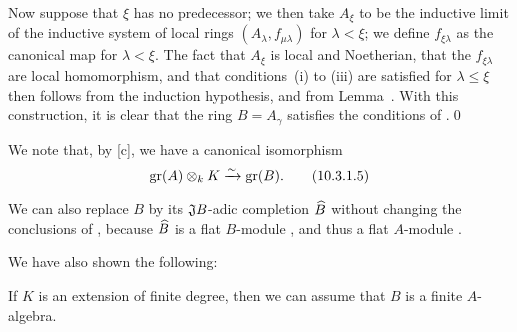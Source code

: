\begin{env}[10.3.1.4]
Now suppose that $\xi$ has no predecessor;
we then take $A_\xi$ to be the inductive limit of the inductive system of local rings $(A_\lambda,f_{\mu\lambda})$ for $\lambda<\xi$;
we define $f_{\xi\lambda}$ as the canonical map for $\lambda<\xi$.
The fact that $A_\xi$ is local and Noetherian, that the $f_{\xi\lambda}$ are local homomorphism, and that conditions~(i) to (iii) are satisfied for $\lambda\leq\xi$
then follows from the induction hypothesis, and from Lemma~.
With this construction, it is clear that the ring $B=A_\gamma$ satisfies the conditions of .\qed
\end{env}

We note that, by [c], we have a canonical isomorphism
\[
\label{eq:0.10.3.1.5}
  {\mathop{\mathrm{gr}}\nolimits}(A)\otimes_k K\xrightarrow{\sim}{\mathop{\mathrm{gr}}\nolimits}(B).
  \tag{10.3.1.5}
\]

We can also replace $B$ by its $\mathfrak{J}B$-adic completion ${\widehat{B}}$ without changing the conclusions of , because ${\widehat{B}}$ is a flat $B$-module , and thus a flat $A$-module .

We have also shown the following:
\begin{cor}[10.3.2]
\label{0.10.3.2}
If $K$ is an extension of finite degree, then we can assume that $B$ is a finite $A$-algebra.
\end{cor}

